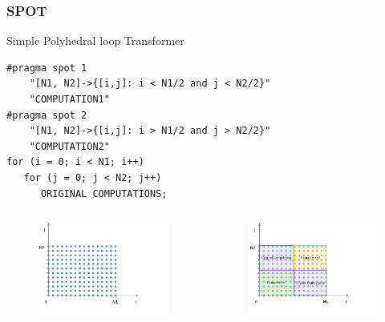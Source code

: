 \documentclass{beamer}\usetheme{Madrid} %
\begin{document}
\begin{frame}[fragile]
\frametitle { SPOT } Simple Polyhedral loop Transformer
\begin{verbatim}
#pragma spot 1 
    "[N1, N2]->{[i,j]: i < N1/2 and j < N2/2}" 
    "COMPUTATION1"
#pragma spot 2 
	"[N1, N2]->{[i,j]: i > N1/2 and j > N2/2}" 
	"COMPUTATION2"
for (i = 0; i < N1; i++) 
   for (j = 0; j < N2; j++)
      ORIGINAL COMPUTATIONS;
\end{verbatim}
\end{frame}
\begin{frame}
\begin{columns}
\begin{figure}
        \includegraphics[scale=0.35]{img/itspace-white.png}
\end{figure}
\begin{figure}
    \includegraphics[scale=0.35]{img/itspace_trans-white.png}
\end{figure}
\end{columns}
\end{frame}
\end{document}
